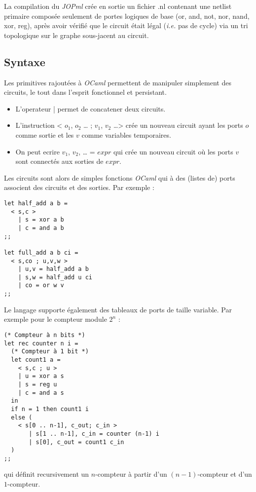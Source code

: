 \documentclass{article}
\begin{document}
La compilation du \emph{JOPml} crée en sortie un fichier .nl contenant une netlist primaire composée seulement de portes logiques de base (or, and, not, nor, nand, xor, reg), après avoir vérifié que le circuit était légal (\emph{i.e.} pas de cycle) via un tri topologique sur le graphe sous-jacent au circuit.

\subsection{Syntaxe}

Les primitives rajoutées à \emph{OCaml} permettent de manipuler simplement des circuits, le tout dans l'esprit fonctionnel et persistant.

\begin{itemize}
\item L'operateur \og | \fg{} permet de concatener deux circuits.
\item L'instruction \og < $o_1$, $o_2$ \dots{} ; $v_1$, $v_2$ \dots > \fg{} crée un nouveau circuit ayant les ports $o$ comme sortie et les $v$ comme variables temporaires.
\item On peut ecrire \og $v_1$, $v_2$, \dots{} = $expr$ \fg{} qui crée un nouveau circuit où les ports $v$ sont connectés aux sorties de $expr$.
\end{itemize}

Les circuits sont alors de simples fonctions \emph{OCaml} qui à des (listes de) ports associent des circuits et des sorties. Par exemple :
\begin{verbatim}
let half_add a b =
  < s,c >
    | s = xor a b
    | c = and a b
;;

let full_add a b ci =
  < s,co ; u,v,w >
    | u,v = half_add a b
    | s,w = half_add u ci
    | co = or w v
;;
\end{verbatim}

Le langage supporte également des tableaux de ports de taille variable. Par exemple pour le compteur module $2^n$ :

\begin{verbatim}
(* Compteur à n bits *)
let rec counter n i =
  (* Compteur à 1 bit *)
  let count1 a =
    < s,c ; u >
    | u = xor a s
    | s = reg u
    | c = and a s
  in
  if n = 1 then count1 i
  else (
    < s[0 .. n-1], c_out; c_in >
	   | s[1 .. n-1], c_in = counter (n-1) i
	   | s[0], c_out = count1 c_in
  )
;;
\end{verbatim}
qui définit recursivement un $n$-compteur à partir d'un $(n-1)$-compteur et d'un $1$-compteur.
\end{document}
